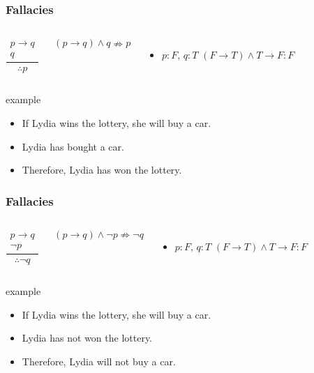 \documentclass[dvipsnames]{beamer}
\begin{document}
\begin{frame}
  \frametitle{Fallacies}

  \begin{columns}
    \[
    \frac
      {
      \begin{array}{c}
        p \rightarrow q\\
        q
        \end{array}
      }
      {
        \therefore p
      }
    \]

    \medskip
    $(p \rightarrow q) \wedge q \nRightarrow p$
    \begin{itemize}
     \item $p: F$, $q: T$
      \smallskip
      $(F \rightarrow T) \wedge T \rightarrow F: F$
    \end{itemize}
  \end{columns}

  \pause
  \begin{exampleblock}{example}
    \begin{itemize}
      \item If Lydia wins the lottery, she will buy a car.
      \item Lydia has bought a car.

      \medskip
      \item Therefore, Lydia has won the lottery.
    \end{itemize}
  \end{exampleblock}
\end{frame}

\begin{frame}
  \frametitle{Fallacies}

  \begin{columns}
    \[
    \frac
      {
        \begin{array}{c}
          p \rightarrow q\\
          \neg p
        \end{array}
      }
      {
        \therefore \neg q
      }
    \]

    $(p \rightarrow q) \wedge \neg p \nRightarrow \neg q$
    \begin{itemize}
     \item $p: F$, $q: T$
      \smallskip
      $(F \rightarrow T) \wedge T \rightarrow F: F$
    \end{itemize}
  \end{columns}

  \pause
  \begin{exampleblock}{example}
    \begin{itemize}
      \item If Lydia wins the lottery, she will buy a car.
      \item Lydia has not won the lottery.

      \medskip
      \item Therefore, Lydia will not buy a car.
    \end{itemize}
  \end{exampleblock}
\end{frame}
\end{document}
